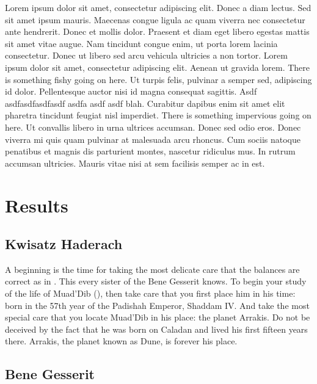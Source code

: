 
Lorem ipsum dolor sit amet, consectetur adipiscing elit. Donec a diam lectus. Sed sit amet ipsum mauris. Maecenas
congue ligula ac quam viverra nec consectetur ante hendrerit. Donec et mollis dolor. Praesent et diam eget libero
egestas mattis sit amet vitae augue. Nam tincidunt congue enim, ut porta lorem lacinia consectetur\cite{OKeeNade78a}.
Donec ut libero sed arcu vehicula ultricies a non tortor. Lorem ipsum dolor sit amet, consectetur adipiscing elit.
Aenean ut gravida lorem. There is something fishy going on here. Ut turpis felis, pulvinar a semper sed, adipiscing id
dolor. Pellentesque auctor nisi id magna consequat sagittis. Asdf asdfasdfasdfasdf asdfa asdf asdf blah. Curabitur
dapibus enim sit amet elit pharetra tincidunt feugiat nisl imperdiet. There is something impervious going on here. Ut
convallis libero in urna ultrices accumsan. Donec sed odio eros. Donec viverra mi quis quam pulvinar at malesuada arcu
rhoncus. Cum sociis natoque penatibus et magnis dis parturient montes, nascetur ridiculus mus. In rutrum accumsan
ultricies. Mauris vitae nisi at sem facilisis semper ac in est.

\section*{Results}

\subsection*{Kwisatz Haderach}

A beginning is the time for taking the most delicate care that the balances are correct as in . This every
sister of the Bene Gesserit knows.  To begin your study of the life
of Muad'Dib (), then take care that you first place him in his time: born in the 57th year of the
Padishah Emperor, Shaddam IV. And take the most special care that you locate Muad'Dib in his place: the planet Arrakis.
Do not be deceived by the fact that he was born on Caladan and lived his first fifteen years there. Arrakis, the planet
known as Dune, is forever his place.

\subsection*{Bene Gesserit}

